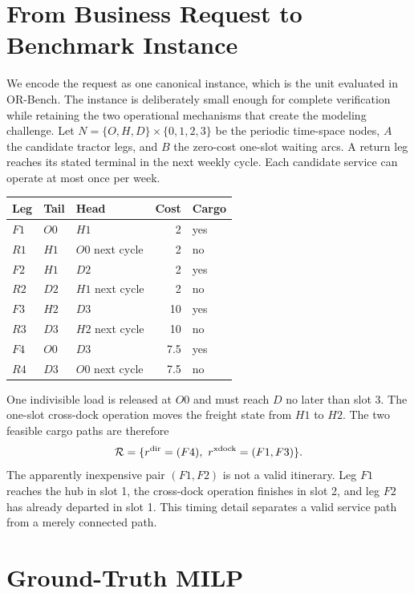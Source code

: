 \documentclass[10pt]{article}
\begin{document}
\section{From Business Request to Benchmark Instance}

We encode the request as one canonical instance, which is the unit evaluated in OR-Bench. The instance is deliberately small enough for complete verification while retaining the two operational mechanisms that create the modeling challenge. Let $N=\{O,H,D\}\times\{0,1,2,3\}$ be the periodic time-space nodes, $A$ the candidate tractor legs, and $B$ the zero-cost one-slot waiting arcs. A return leg reaches its stated terminal in the next weekly cycle. Each candidate service can operate at most once per week.

\begin{center}
\begin{tabularx}{0.96\linewidth}{l Y Y r l@{}}
\toprule
Leg & Tail & Head & Cost & Cargo \\
\midrule
$F1$ & $O0$ & $H1$ & 2 & yes \\
$R1$ & $H1$ & $O0$ next cycle & 2 & no \\
$F2$ & $H1$ & $D2$ & 2 & yes \\
$R2$ & $D2$ & $H1$ next cycle & 2 & no \\
$F3$ & $H2$ & $D3$ & 10 & yes \\
$R3$ & $D3$ & $H2$ next cycle & 10 & no \\
$F4$ & $O0$ & $D3$ & 7.5 & yes \\
$R4$ & $D3$ & $O0$ next cycle & 7.5 & no \\
\bottomrule
\end{tabularx}
\end{center}

One indivisible load is released at $O0$ and must reach $D$ no later than slot 3. The one-slot cross-dock operation moves the freight state from $H1$ to $H2$. The two feasible cargo paths are therefore
\[
\mathcal R=\{r^{\rm dir}=(F4),\ r^{\rm xdock}=(F1,F3)\}.
\]
The apparently inexpensive pair $(F1,F2)$ is not a valid itinerary. Leg $F1$ reaches the hub in slot 1, the cross-dock operation finishes in slot 2, and leg $F2$ has already departed in slot 1. This timing detail separates a valid service path from a merely connected path.

\newpage
\section{Ground-Truth MILP}
\end{document}

